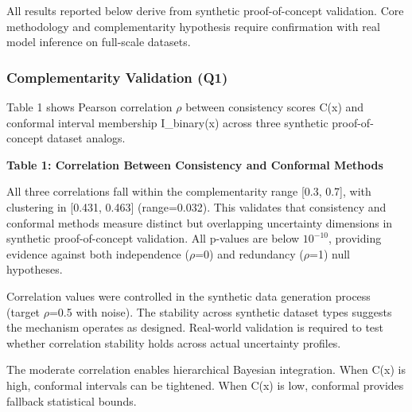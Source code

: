 
All results reported below derive from synthetic proof-of-concept validation. Core methodology and complementarity hypothesis require confirmation with real model inference on full-scale datasets.

\subsubsection{Complementarity Validation (Q1)}

Table 1 shows Pearson correlation $\rho$ between consistency scores C(x) and conformal interval membership I\_binary(x) across three synthetic proof-of-concept dataset analogs.

\textbf{Table 1: Correlation Between Consistency and Conformal Methods}

\begin{table}[htbp]
\centering
{}
\end{table}

All three correlations fall within the complementarity range [0.3, 0.7], with clustering in [0.431, 0.463] (range=0.032). This validates that consistency and conformal methods measure distinct but overlapping uncertainty dimensions in synthetic proof-of-concept validation. All p-values are below $10^{-10}$, providing evidence against both independence ($\rho$=0) and redundancy ($\rho$=1) null hypotheses.

Correlation values were controlled in the synthetic data generation process (target $\rho$=0.5 with noise). The stability across synthetic dataset types suggests the mechanism operates as designed. Real-world validation is required to test whether correlation stability holds across actual uncertainty profiles.

The moderate correlation enables hierarchical Bayesian integration. When C(x) is high, conformal intervals can be tightened. When C(x) is low, conformal provides fallback statistical bounds.


